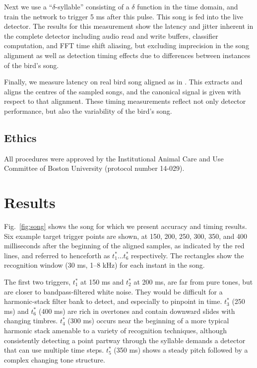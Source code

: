 \documentclass[10pt,letterpaper]{article}
\newcommand\fig[1]{Fig.~\ref{#1}}
\begin{document}
Next we use a ``$\delta$-syllable'' consisting of a $\delta$ function
in the time domain, and train the network to trigger 5 ms after this
pulse.  This song is fed into the live detector.  The results for this
measurement show the latency and jitter inherent in the complete
detector including audio read and write buffers, classifier
computation, and FFT time shift aliasing, but excluding imprecision in
the song alignment as well as detection timing effects due to
differences between instances of the bird's song.

Finally, we measure latency on real bird song aligned as in
\cite{Poole2012}.  This extracts and aligns the centres of the sampled
songs, and the canonical signal is given with respect to that
alignment.  These timing measurements reflect not only detector
performance, but also the variability of the bird's song.

\subsection{Ethics}

All procedures were approved by the Institutional Animal Care and Use
Committee of Boston University (protocol number 14-029).

\section{Results}
\label{sec:results}

\fig{fig:song} shows the song for which we present accuracy and timing
results.  Six example target trigger points are shown, at 150, 200,
250, 300, 350, and 400 milliseconds after the beginning of the aligned
samples, as indicated by the red lines, and referred to henceforth as
$t^*_1\ldots t^*_6$ respectively.  The rectangles show the recognition
window (30 ms, 1--8 kHz) for each instant in the song.

The first two triggers, $t^*_1$ at 150 ms and $t^*_2$ at 200 ms, are
far from pure tones, but are closer to bandpass-filtered white noise.  They would be
difficult for a harmonic-stack filter bank to detect, and especially
to pinpoint in time.  $t^*_3$ (250 ms) and $t^*_6$ (400 ms) are rich
in overtones and contain downward slides with changing timbres.
$t^*_4$ (300 ms) occurs near the beginning of a more typical harmonic
stack amenable to a variety of recognition techniques, although
consistently detecting a point partway through the syllable demands a
detector that can use multiple time steps.  $t^*_5$ (350 ms) shows a
steady pitch followed by a complex changing tone structure.
\end{document}
